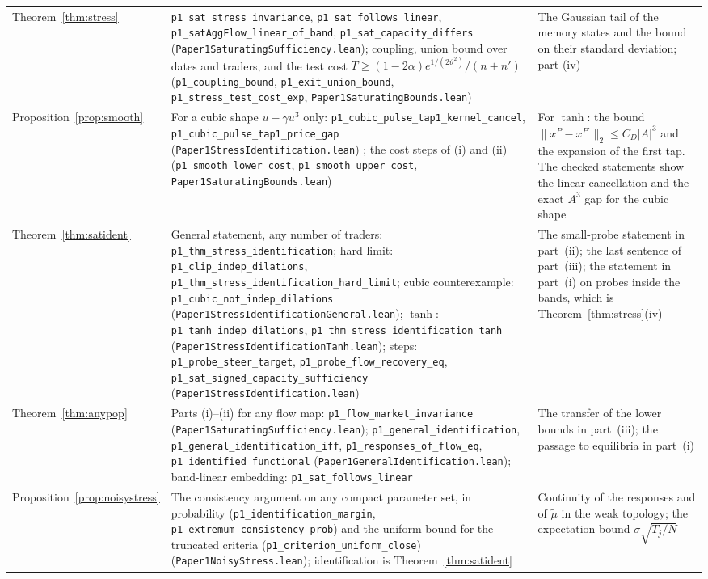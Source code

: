 \begin{longtable}{>{\raggedright\arraybackslash}p{}>{\raggedright\arraybackslash}p{}>{\raggedright\arraybackslash}p{}}
Theorem~\ref{thm:stress} & \texttt{p1\_sat\_stress\_invariance}, \texttt{p1\_sat\_follows\_linear}, \texttt{p1\_satAggFlow\_linear\_of\_band}, \texttt{p1\_sat\_capacity\_differs} (\nolinkurl{Paper1SaturatingSufficiency.lean}); coupling, union bound over dates and traders, and the test cost $T\ge(1-2\alpha)e^{1/(2\vartheta^2)}/(n+n')$ (\texttt{p1\_coupling\_bound}, \texttt{p1\_exit\_union\_bound}, \texttt{p1\_stress\_test\_cost\_exp}, \nolinkurl{Paper1SaturatingBounds.lean}) & The Gaussian tail of the memory states and the bound on their standard deviation; part (iv)\\
Proposition~\ref{prop:smooth} & For a cubic shape $u-\gamma u^3$ only: \texttt{p1\_cubic\_pulse\_tap1\_kernel\_cancel}, \texttt{p1\_cubic\_pulse\_tap1\_price\_gap} (\nolinkurl{Paper1StressIdentification.lean}) ; the cost steps of (i) and (ii) (\texttt{p1\_smooth\_lower\_cost}, \texttt{p1\_smooth\_upper\_cost}, \nolinkurl{Paper1SaturatingBounds.lean}) & For $\tanh$: the bound $\|x^P-x^{P'}\|_2\le C_D|A|^3$ and the expansion of the first tap. The checked statements show the linear cancellation and the exact $A^3$ gap for the cubic shape\\
Theorem~\ref{thm:satident} & General statement, any number of traders: \texttt{p1\_thm\_stress\_identification}; hard limit: \texttt{p1\_clip\_indep\_dilations}, \nolinkurl{p1_thm_stress_identification_hard_limit}; cubic counterexample: \texttt{p1\_cubic\_not\_indep\_dilations} (\nolinkurl{Paper1StressIdentificationGeneral.lean}); $\tanh$: \texttt{p1\_tanh\_indep\_dilations}, \nolinkurl{p1_thm_stress_identification_tanh} (\nolinkurl{Paper1StressIdentificationTanh.lean}); steps: \texttt{p1\_probe\_steer\_target}, \texttt{p1\_probe\_flow\_recovery\_eq}, \texttt{p1\_sat\_signed\_capacity\_sufficiency} (\nolinkurl{Paper1StressIdentification.lean}) & The small-probe statement in part~(ii); the last sentence of part~(iii); the statement in part~(i) on probes inside the bands, which is Theorem~\ref{thm:stress}(iv)\\
Theorem~\ref{thm:anypop} & Parts (i)--(ii) for any flow map: \texttt{p1\_flow\_market\_invariance} (\nolinkurl{Paper1SaturatingSufficiency.lean}); \texttt{p1\_general\_identification}, \texttt{p1\_general\_identification\_iff}, \texttt{p1\_responses\_of\_flow\_eq}, \texttt{p1\_identified\_functional} (\nolinkurl{Paper1GeneralIdentification.lean}); band-linear embedding: \texttt{p1\_sat\_follows\_linear} & The transfer of the lower bounds in part~(iii); the passage to equilibria in part~(i)\\
Proposition~\ref{prop:noisystress} & The consistency argument on any compact parameter set, in probability (\texttt{p1\_identification\_margin}, \texttt{p1\_extremum\_consistency\_prob}) and the uniform bound for the truncated criteria (\texttt{p1\_criterion\_uniform\_close}) (\nolinkurl{Paper1NoisyStress.lean}); identification is Theorem~\ref{thm:satident} & Continuity of the responses and of $\tilde\mu$ in the weak topology; the expectation bound $\sigma\sqrt{T_j/N}$\\

\end{longtable}
